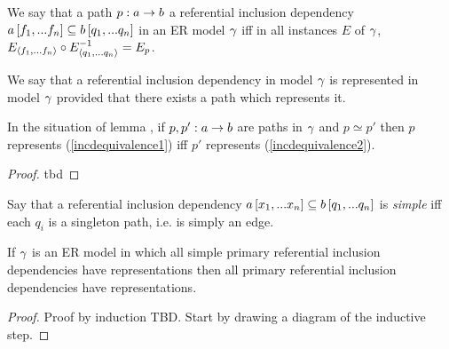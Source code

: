 \begin{definition}
We say that a path $p:a \rightarrow b$  a referential inclusion dependency
$a\left[f_1,...f_n\right]\subseteq b\left[q_1,...q_n\right]$  in an ER model $\gamma$ iff
  in all instances $E$ of $\gamma$, $E_{\langle f_1,...f_n\rangle} \circ E_{\langle q_1,...q_n\rangle}^{-1}=E_p$.
\end{definition}
We say that a referential inclusion dependency in model $\gamma$ is represented in model $\gamma$ provided that there exists a path which represents it. 

\begin{lemma}
In the situation of lemma , if $p,p':a \rightarrow b$
are paths in $\gamma$ and $p \simeq p'$ then $p$ represents (\ref{incdequivalence1})
iff $p'$ represents (\ref{incdequivalence2}). 
\end{lemma}
\begin{proof}
tbd
\end{proof}
\iffalse
\begin{categoricalaside}
If an ER schema is represented as a category with finite products (\textit{a la} Johnstone \textit{et al}) then
a referential inclusion dependency is a diagram
\begin{center}
$
\begin{array}{cp{0.75cm}c}
   \Rnode{a}{a}     & & \Rnode{x}{x}  \\[1.2cm]     
	                  & & \Rnode{b}{b}  
\end{array}
$
\ncarr{a}{x} 
\alabel{f}[0.33]
\ncarr{b}{x}
\blabel{m}[0.3]
\idcomp
\end{center}
\noindent
in \cat{C} such that in all instance functors $F$, 
$F(f)$ factors through $F(m)$.

Such a referential inclusion dependency is explicitly represented iff
 $f$ factors through $m$ i.e. there is an $f_0: a \morph b$ in \cat{C} such that 
$f_0 \circ m =f$. Note that because $m$ is monic then such an $f_0$ is the unique such morphism and if in some instance $F$,
$e: F(a) \morph F(b)$ is a function such that $e \circ F(m) = F(f)$ then $F(f_0)=e$. 
\end{categoricalaside}
\fi


\begin{definition}
Say that a referential inclusion dependency $a\left[x_1,...x_n\right]\subseteq b\left[q_1,...q_n\right]$ is \textit{simple}
iff each $q_i$ is a singleton path, i.e. is simply an edge. 
\end{definition}

\begin{lemma}
If  $\gamma$ is an ER model in which all simple primary referential inclusion dependencies
have representations then all primary referential inclusion dependencies have representations. 
\end{lemma}
\begin{proof}
Proof by induction TBD. Start by drawing a diagram of the inductive step.
\end{proof}



